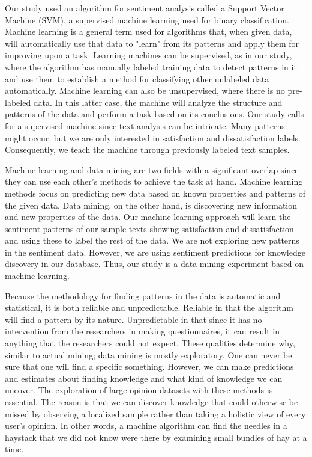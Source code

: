 \documentclass[smallextended,natbib]{svjour3}       %
\begin{document}
    Our study used an algorithm for sentiment analysis called a Support Vector Machine (SVM), a supervised machine learning used for binary classification. Machine learning is a general term used for algorithms that, when given data, will automatically use that data to "learn" from its patterns and apply them for improving upon a task. Learning machines can be supervised, as in our study, where the algorithm has manually labeled training data to detect patterns in it and use them to establish a method for classifying other unlabeled data automatically. Machine learning can also be unsupervised, where there is no pre-labeled data. In this latter case, the machine will analyze the structure and patterns of the data and perform a task based on its conclusions. Our study calls for a supervised machine since text analysis can be intricate. Many patterns might occur, but we are only interested in satisfaction and dissatisfaction labels. Consequently, we teach the machine through previously labeled text samples. 

    Machine learning and data mining are two fields with a significant overlap since they can use each other's methods to achieve the task at hand. Machine learning methods focus on predicting new data based on known properties and patterns of the given data. Data mining, on the other hand, is discovering new information and new properties of the data. Our machine learning approach will learn the sentiment patterns of our sample texts showing satisfaction and dissatisfaction and using these to label the rest of the data. We are not exploring new patterns in the sentiment data. However, we are using sentiment predictions for knowledge discovery in our database. Thus, our study is a data mining experiment based on machine learning.

    Because the methodology for finding patterns in the data is automatic and statistical, it is both reliable and unpredictable. Reliable in that the algorithm will find a pattern by its nature. Unpredictable in that since it has no intervention from the researchers in making questionnaires, it can result in anything that the researchers could not expect. These qualities determine why, similar to actual mining; data mining is mostly exploratory. One can never be sure that one will find a specific something. However, we can make predictions and estimates about finding knowledge and what kind of knowledge we can uncover. The exploration of large opinion datasets with these methods is essential. The reason is that we can discover knowledge that could otherwise be missed by observing a localized sample rather than taking a holistic view of every user's opinion. In other words, a machine algorithm can find the needles in a haystack that we did not know were there by examining small bundles of hay at a time.
\end{document}

